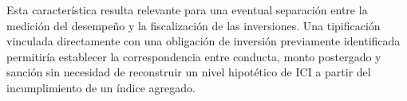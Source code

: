 Esta característica resulta relevante para una eventual separación entre la medición del desempeño y la fiscalización de las inversiones. Una tipificación vinculada directamente con una obligación de inversión previamente identificada permitiría establecer la correspondencia entre conducta, monto postergado y sanción sin necesidad de reconstruir un nivel hipotético de ICI a partir del incumplimiento de un índice agregado.